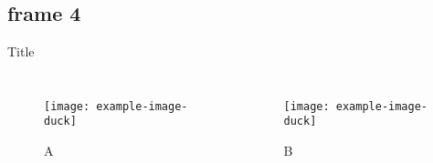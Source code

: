 \documentclass{beamer}
\begin{document}
\subsection{frame 4}
\begin{frame}{Title}
\begin{columns}
\begin{figure}
\texttt{[image: example-image-duck]}
\caption{A}
\end{figure}
\begin{figure}
\texttt{[image: example-image-duck]}
\caption{B}
\end{figure}
\end{columns}
\end{frame}
\end{document}
